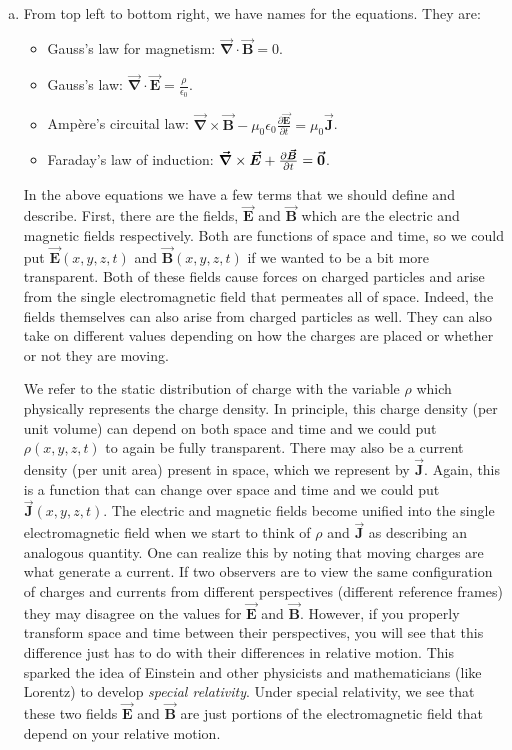 \documentclass[12pt]{article} %
\newcommand{\vecfieldB}{\boldsymbol{\vec{B}}}
\newcommand{\vecfieldE}{\boldsymbol{\vec{E}}}
\newcommand{\vecfieldJ}{\boldsymbol{\vec{J}}}
\newcommand{\grad}{\boldsymbol{\vec{\nabla}}}
\begin{document}
\begin{solution}~
\begin{enumerate}[(a)]
    \item From top left to bottom right, we have names for the equations.  They are:
    \begin{itemize}
        \item Gauss's law for magnetism: $\grad \cdot \vecfieldB = 0$.
        \item Gauss's law: $\grad \cdot \vecfieldE = \frac{\rho}{\epsilon_0}$.
        \item Amp\`ere's circuital law: $\grad \times \vecfieldB -\mu_0 \epsilon_0\frac{\partial \vecfieldE}{\partial t}=\mu_0 \vecfieldJ$.
        \item Faraday's law of induction: $\grad \times \vecfieldE + \frac{\partial \vecfieldB}{\partial t} = \zerovec$.
    \end{itemize}
    
    In the above equations we have a few terms that we should define and describe.  First, there are the fields, $\vecfieldE$ and $\vecfieldB$ which are the electric and magnetic fields respectively.  Both are functions of space and time, so we could put $\vecfieldE(x,y,z,t)$ and $\vecfieldB(x,y,z,t)$ if we wanted to be a bit more transparent.  Both of these fields cause forces on charged particles and arise from the single electromagnetic field that permeates all of space.  Indeed, the fields themselves can also arise from charged particles as well.  They can also take on different values depending on how the charges are placed or whether or not they are moving.
    
    We refer to the static distribution of charge with the variable $\rho$ which physically represents the charge density.  In principle, this charge density (per unit volume) can depend on both space and time and we could put $\rho(x,y,z,t)$ to again be fully transparent.  There may also be a current density (per unit area) present in space, which we represent by $\vecfieldJ$. Again, this is a function that can change over space and time and we could put $\vecfieldJ(x,y,z,t)$.  The electric and magnetic fields become unified into the single electromagnetic field when we start to think of $\rho$ and $\vecfieldJ$ as describing an analogous quantity. One can realize this by noting that moving charges are what generate a current.  If two observers are to view the same configuration of charges and currents from different perspectives (different reference frames) they may disagree on the values for $\vecfieldE$ and $\vecfieldB$.  However, if you properly transform space and time between their perspectives, you will see that this difference just has to do with their differences in relative motion.  This sparked the idea of Einstein and other physicists and mathematicians (like Lorentz) to develop \emph{special relativity}.  Under special relativity, we see that these two fields $\vecfieldE$ and $\vecfieldB$ are just portions of the electromagnetic field that depend on your relative motion.
    

\end{enumerate}
\end{solution}
\end{document}
